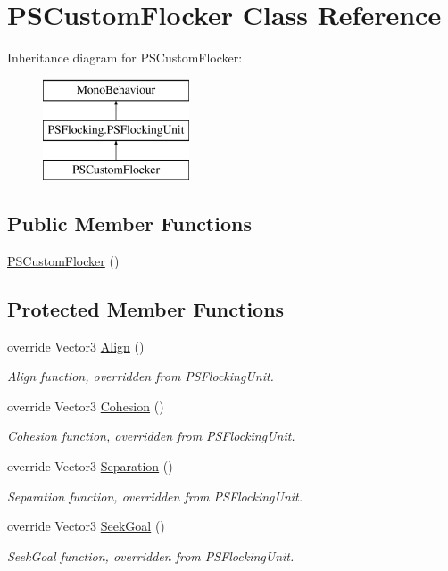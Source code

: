 \hypertarget{class_p_s_custom_flocker}{}\section{P\+S\+Custom\+Flocker Class Reference}
\label{class_p_s_custom_flocker}
Inheritance diagram for P\+S\+Custom\+Flocker\+:\begin{figure}[H]
\begin{center}
\leavevmode
\includegraphics[height=3.000000cm]{class_p_s_custom_flocker}
\end{center}
\end{figure}
\subsection*{Public Member Functions}
\begin{DoxyCompactItemize}
\item 
\hyperlink{class_p_s_custom_flocker_aecf3471651ecc3e957b5144b0e6b9b21}{P\+S\+Custom\+Flocker} ()
\end{DoxyCompactItemize}
\subsection*{Protected Member Functions}
\begin{DoxyCompactItemize}
\item 
override Vector3 \hyperlink{class_p_s_custom_flocker_a50d8ac4146196420bcf1181289a27e40}{Align} ()
\begin{DoxyCompactList}\small\item\em Align function, overridden from P\+S\+Flocking\+Unit. \end{DoxyCompactList}\item 
override Vector3 \hyperlink{class_p_s_custom_flocker_a46d7ff69872c12983a666293794b976f}{Cohesion} ()
\begin{DoxyCompactList}\small\item\em Cohesion function, overridden from P\+S\+Flocking\+Unit. \end{DoxyCompactList}\item 
override Vector3 \hyperlink{class_p_s_custom_flocker_a2ab0990e603a5102fc80dafee1333c7c}{Separation} ()
\begin{DoxyCompactList}\small\item\em Separation function, overridden from P\+S\+Flocking\+Unit. \end{DoxyCompactList}\item 
override Vector3 \hyperlink{class_p_s_custom_flocker_a43590dd2fdf5f37d2116cf08473375c7}{Seek\+Goal} ()
\begin{DoxyCompactList}\small\item\em Seek\+Goal function, overridden from P\+S\+Flocking\+Unit. \end{DoxyCompactList}\end{DoxyCompactItemize}
